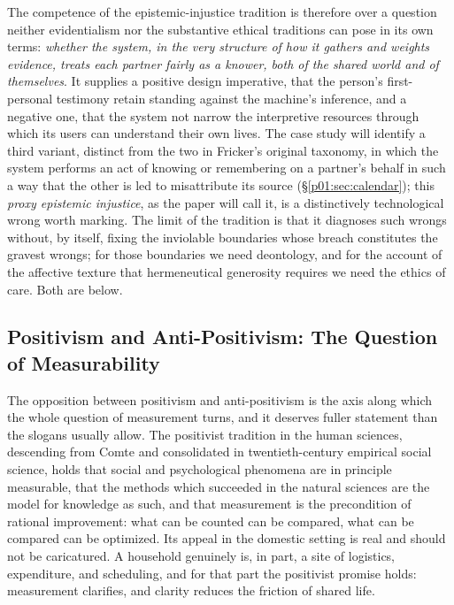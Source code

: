 \documentclass[11pt,a4paper]{article}
\begin{document}
The competence of the epistemic-injustice tradition is therefore over a question neither evidentialism nor the substantive ethical traditions can pose in its own terms: \emph{whether the system, in the very structure of how it gathers and weights evidence, treats each partner fairly as a knower, both of the shared world and of themselves}. It supplies a positive design imperative, that the person's first-personal testimony retain standing against the machine's inference, and a negative one, that the system not narrow the interpretive resources through which its users can understand their own lives. The case study will identify a third variant, distinct from the two in Fricker's original taxonomy, in which the system performs an act of knowing or remembering on a partner's behalf in such a way that the other is led to misattribute its source (§\ref{p01:sec:calendar}); this \emph{proxy epistemic injustice}, as the paper will call it, is a distinctively technological wrong worth marking. The limit of the tradition is that it diagnoses such wrongs without, by itself, fixing the inviolable boundaries whose breach constitutes the gravest wrongs; for those boundaries we need deontology, and for the account of the affective texture that hermeneutical generosity requires we need the ethics of care. Both are below.

\subsection{Positivism and Anti-Positivism: The Question of Measurability}\label{p01:sec:posneg}

The opposition between positivism and anti-positivism is the axis along which the whole question of measurement turns, and it deserves fuller statement than the slogans usually allow. The positivist tradition in the human sciences, descending from Comte and consolidated in twentieth-century empirical social science, holds that social and psychological phenomena are in principle measurable, that the methods which succeeded in the natural sciences are the model for knowledge as such, and that measurement is the precondition of rational improvement: what can be counted can be compared, what can be compared can be optimized. Its appeal in the domestic setting is real and should not be caricatured. A household genuinely is, in part, a site of logistics, expenditure, and scheduling, and for that part the positivist promise holds: measurement clarifies, and clarity reduces the friction of shared life.
\end{document}

